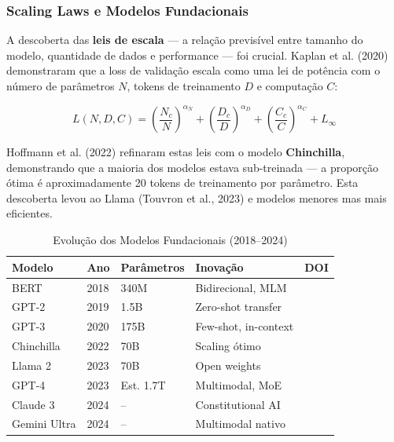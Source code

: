 \subsubsection{Scaling Laws e Modelos Fundacionais}

A descoberta das \textbf{leis de escala} --- a relação previsível entre tamanho do modelo, quantidade de dados e performance --- foi crucial. Kaplan et al. (2020) \cite{kaplan2020scaling} demonstraram que a loss de validação escala como uma lei de potência com o número de parâmetros $N$, tokens de treinamento $D$ e computação $C$:

\begin{equation}
L(N, D, C) = \left(\frac{N_c}{N}\right)^{\alpha_N} + \left(\frac{D_c}{D}\right)^{\alpha_D} + \left(\frac{C_c}{C}\right)^{\alpha_C} + L_\infty
\label{eq:scaling_law}
\end{equation}

Hoffmann et al. (2022) \cite{hoffmann2022training} refinaram estas leis com o modelo \textbf{Chinchilla}, demonstrando que a maioria dos modelos estava sub-treinada --- a proporção ótima é aproximadamente 20 tokens de treinamento por parâmetro. Esta descoberta levou ao Llama (Touvron et al., 2023) \cite{touvron2023llama} e modelos menores mas mais eficientes.

\begin{table}[htbp]
\centering
\caption{Evolução dos Modelos Fundacionais (2018--2024)}
\label{tab:llm_evolution}
\begin{tabular}{p{2.5cm}p{1.5cm}p{1.5cm}p{2.5cm}p{3cm}}
\hline
\textbf{Modelo} & \textbf{Ano} & \textbf{Parâmetros} & \textbf{Inovação} & \textbf{DOI} \\
\hline
BERT & 2018 & 340M & Bidirecional, MLM & \cite{devlin2019bert} \\
GPT-2 & 2019 & 1.5B & Zero-shot transfer & \cite{radford2019language} \\
GPT-3 & 2020 & 175B & Few-shot, in-context & \cite{brown2020language} \\
Chinchilla & 2022 & 70B & Scaling ótimo & \cite{hoffmann2022training} \\
Llama 2 & 2023 & 70B & Open weights & \cite{touvron2023llama} \\
GPT-4 & 2023 & Est. 1.7T & Multimodal, MoE & \cite{openai2023gpt4} \\
Claude 3 & 2024 & -- & Constitutional AI & \cite{anthropic2024claude} \\
Gemini Ultra & 2024 & -- & Multimodal nativo & \cite{google2024gemini} \\
\hline
\end{tabular}
\end{table}

